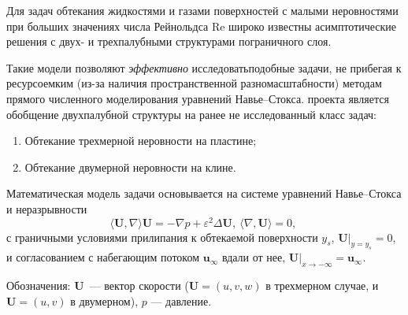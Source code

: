 \documentclass[../master.tex]{subfiles}
\begin{document}
 Для задач обтекания жидкостями и газами поверхностей с малыми неровностями при больших значениях числа Рейнольдса $\mathrm{Re}$ широко известны асимптотические решения с двух- и трехпалубными структурами пограничного слоя. 

Такие модели позволяют \emph{эффективно} исследовать\linebreak подобные задачи, не прибегая к ресурсоемким (из-за наличия пространственной разномасштабности)  методам  прямого численного моделирования уравнений Навье--Стокса.
проекта является обобщение двухпалубной структуры на ранее не исследованный класс задач:
\begin{enumerate}
    \item Обтекание трехмерной неровности на пластине; 
    \item Обтекание двумерной неровности на клине.
\end{enumerate}
Математическая модель задачи основывается на системе уравнений Навье--Стокса и неразрывности
\[\langle \mathbf{U}, \nabla \rangle \mathbf{U} = - \nabla p + \varepsilon^2 \Delta \mathbf{U}, \
\langle \nabla, \mathbf{U} \rangle = 0,\   
\]
 с граничными условиями прилипания к обтекаемой поверхности $y_s$, $\mathbf{U}\big|_{y=y_s} = 0$,  и согласованием с набегающим потоком $\mathbf u_\infty$ вдали от нее, $ \mathbf{U}\big|_{ x \to -\infty} = \mathbf u_\infty$.
 
Обозначения: $\mathbf U$~--- вектор скорости ($\mathbf U = (u,v,w)$ в трехмерном случае, и $\mathbf U = (u,v)$ в двумерном), $p$ --- давление.
\end{document}
